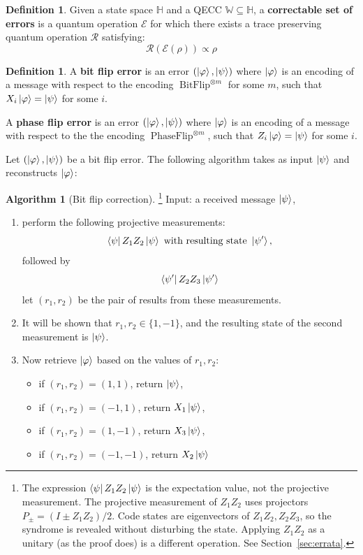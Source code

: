 \documentclass[12pt]{article}
\theoremstyle{plain}
\theoremstyle{definition}
\newtheorem{defn}[thm]{Definition} %
\newtheorem{algorithm}[thm]{Algorithm}
\newcommand{\bb}[1]{\mathbb{#1}}
\newcommand{\scr}[1]{\mathscr{#1}}
\newcommand{\call}[1]{\mathcal{#1}}
\begin{document}
\begin{defn}
Given a state space $\bb{H}$ and a QECC $\bb{W} \subseteq \bb{H}$, a \textbf{correctable set of errors} is a quantum operation $\scr{E}$ for which there exists a trace preserving quantum operation $\call{R}$ satisfying:
\begin{equation}
\call{R}(\scr{E}(\rho))\propto \rho
\end{equation}
\end{defn}
\begin{defn}
A \textbf{bit flip error} is an error $(\ket{\varphi},\ket{\psi})$ where $\ket{\varphi}$ is an encoding of a message with respect to the encoding $\operatorname{BitFlip}^{\otimes m}$ for some $m$, such that $X_i\ket{\varphi} =\ket{\psi}$ for some $i$.

A \textbf{phase flip error} is an error  $(\ket{\varphi},\ket{\psi})$ where $\ket{\varphi}$ is an encoding of a message with respect to the the encoding $\operatorname{PhaseFlip}^{\otimes m}$, such that $Z_i\ket{\varphi} =\ket{\psi}$ for some $i$.
\end{defn}
Let $(\ket{\varphi},\ket{\psi})$ be a bit flip error.  The following algorithm takes as input $\ket{\psi}$ and reconstructs $\ket{\varphi}$:
\begin{algorithm}[Bit flip correction]\label{alg:bit_flip_correction}\footnote{The expression $\bra{\psi}Z_1Z_2\ket{\psi}$ is the expectation value, not the projective measurement. The projective measurement of $Z_1Z_2$ uses projectors $P_\pm=(I\pm Z_1Z_2)/2$. Code states are eigenvectors of $Z_1Z_2,Z_2Z_3$, so the syndrome is revealed without disturbing the state. Applying $Z_1Z_2$ as a unitary (as the proof does) is a different operation. See Section~\ref{sec:errata}.}
Input: a received message $\ket{\psi}$,
\begin{enumerate}
\item perform the following projective measurements:
\begin{equation}
\bra{\psi} Z_1 Z_2 \ket{\psi}\text{ with resulting state }\ket{\psi'},
\end{equation}
followed by
\begin{equation}
\bra{\psi'} Z_2 Z_3 \ket{\psi'}
\end{equation}
let $(r_1,r_2)$ be the pair of results from these measurements.
\item It will be shown that $r_1,r_2 \in \lbrace 1,-1\rbrace$, and the resulting state of the second measurement is $\ket{\psi}$.
\item Now retrieve $\ket{\varphi}$ based on the values of $r_1,r_2$:
\begin{itemize}
\item if $(r_1, r_2) = (1,1)$, return $\ket{\psi}$,
\item if $(r_1,r_2) = (-1,1)$, return $X_1 \ket{\psi}$,
\item if $(r_1,r_2) = (1,-1)$, return $X_3 \ket{\psi}$,
\item if $(r_1,r_2) = (-1,-1)$, return $X_2 \ket{\psi}$
\end{itemize}
\end{enumerate}
\end{algorithm}
\end{document}
